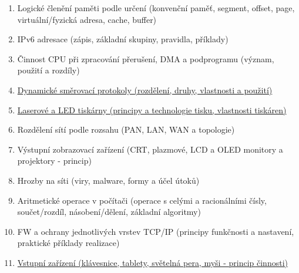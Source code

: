 \documentclass[a4paper,11pt]{article}
\begin{document}
\begin{enumerate}
  \item Logické členění paměti podle určení (konvenční paměť, segment, offset, page, virtuální/fyzická adresa, cache, buffer)
  \item IPv6 adresace (zápis, základní skupiny, pravidla, příklady)
  \item Činnost CPU při zpracování přerušení, DMA a podprogramu (význam, použití a rozdíly)
  \item \hyperref[sec:smerovaci-protokoly]{Dynamické směrovací protokoly (rozdělení, druhy, vlastnosti a použití)}
  \item \hyperref[sec:tiskarny]{Laserové a LED tiskárny (principy a technologie tisku, vlastnosti tiskáren)}
  \item Rozdělení sítí podle rozsahu (PAN, LAN, WAN a topologie)
  \item Výstupní zobrazovací zařízení (CRT, plazmové, LCD a OLED monitory a projektory - princip)
  \item Hrozby na síti (viry, malware, formy a účel útoků)
  \item Aritmetické operace v počítači (operace s celými a racionálními čísly, součet/rozdíl, násobení/dělení, základní algoritmy)
  \item FW a ochrany jednotlivých vrstev TCP/IP (principy funkčnosti a nastavení, praktické příklady realizace)
  \item \hyperref[sec:vstupni-zarizeni]{Vstupní zařízení (klávesnice, tablety, světelná pera, myši - princip činnosti)}
\end{enumerate}


























\end{document}
